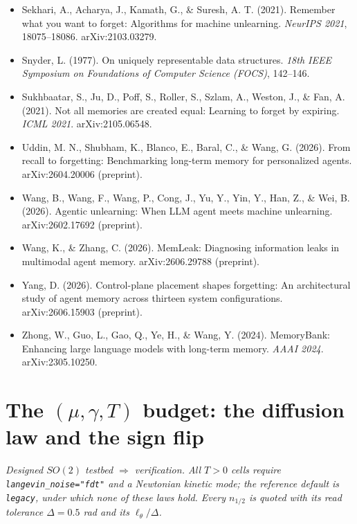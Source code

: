 \documentclass{article}
\begin{document}
{\begin{itemize}
\item Sekhari, A., Acharya, J., Kamath, G., \& Suresh, A. T. (2021). Remember what you want to forget: Algorithms for machine unlearning. \emph{NeurIPS 2021}, 18075--18086. arXiv:2103.03279.
\item Snyder, L. (1977). On uniquely representable data structures. \emph{18th IEEE Symposium on Foundations of Computer Science (FOCS)}, 142--146.
\item Sukhbaatar, S., Ju, D., Poff, S., Roller, S., Szlam, A., Weston, J., \& Fan, A. (2021). Not all memories are created equal: Learning to forget by expiring. \emph{ICML 2021}. arXiv:2105.06548.
\item Uddin, M. N., Shubham, K., Blanco, E., Baral, C., \& Wang, G. (2026). From recall to forgetting: Benchmarking long-term memory for personalized agents. arXiv:2604.20006 (preprint).
\item Wang, B., Wang, F., Wang, P., Cong, J., Yu, Y., Yin, Y., Han, Z., \& Wei, B. (2026). Agentic unlearning: When LLM agent meets machine unlearning. arXiv:2602.17692 (preprint).
\item Wang, K., \& Zhang, C. (2026). MemLeak: Diagnosing information leaks in multimodal agent memory. arXiv:2606.29788 (preprint).
\item Yang, D. (2026). Control-plane placement shapes forgetting: An architectural study of agent memory across thirteen system configurations. arXiv:2606.15903 (preprint).
\item Zhong, W., Guo, L., Gao, Q., Ye, H., \& Wang, Y. (2024). MemoryBank: Enhancing large language models with long-term memory. \emph{AAAI 2024}. arXiv:2305.10250.
\end{itemize}\par}
\section{The $(\mu,\gamma,T)$ budget: the diffusion law and the sign flip}\label{app:budget}

\emph{Designed $SO(2)$ testbed $\Rightarrow$ verification. All $T>0$ cells require \texttt{langevin\_noise="fdt"} and a Newtonian kinetic mode; the reference default is \texttt{legacy}, under which none of these laws hold. Every $n_{1/2}$ is quoted with its read tolerance $\Delta=0.5$ rad and its $\ell_\theta/\Delta$.}
\end{document}
